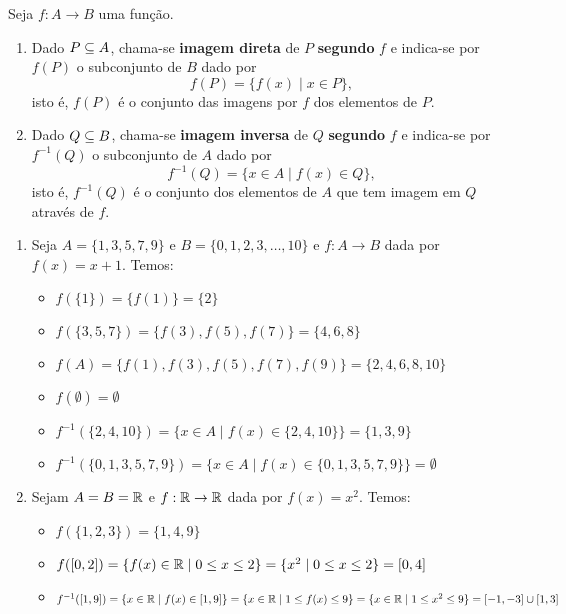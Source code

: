 \begin{definicao}
	Seja $f : A \to B$ uma fun{\c c}{\~a}o.
	\begin{enumerate}[label={\roman*})]
		\item Dado $P \subseteq A$, chama-se \textbf{imagem direta} de $P$  \textbf{segundo} $f$ e indica-se por $f(P)$ o subconjunto de $B$ dado por
		\[
			f(P) = \{f(x) \mid x \in P\},
		\]
		isto {\'e}, $f(P)$ {\'e} o conjunto das imagens por $f$ dos elementos de $P$.

		\item Dado $Q \subseteq B$, chama-se \textbf{imagem inversa} de $Q$ \textbf{segundo} $f$ e indica-se por $f^{-1}(Q)$ o subconjunto de $A$ dado por
		\[
			f^{-1}(Q) = \{x \in A \mid f(x) \in Q\},
		\]
		isto {\'e}, $f^{-1}(Q)$ {\'e} o conjunto dos elementos de $A$ que tem imagem em $Q$ atrav{\'e}s de $f$.
	\end{enumerate}
\end{definicao}

\begin{exemplos}
	\begin{enumerate}[label={\arabic*})]
		\item Seja $A = \{1, 3, 5, 7, 9 \}$ e $B = \{0, 1, 2, 3, \dots, 10\}$ e $f : A \to B$ dada por $f(x) = x + 1$. Temos:
		\begin{itemize}
			\item $f(\{1\}) = \{f(1)\} = \{2\}$

			\item $f(\{3, 5, 7\}) = \{f(3), f(5), f(7)\} = \{4, 6, 8\}$

			\item $f(A) = \{f(1), f(3), f(5), f(7), f(9)\} = \{2, 4, 6, 8, 10\}$

			\item $f(\emptyset) = \emptyset$

			\item $f^{-1}(\{2, 4, 10\}) = \{x \in A \mid f(x) \in \{2, 4, 10\}\} = \{1, 3, 9\}$

			\item $f^{-1}(\{0, 1, 3, 5, 7, 9\}) = \{x \in A \mid f(x) \in \{0, 1, 3, 5, 7, 9\}\} = \emptyset$
		\end{itemize}

		\item Sejam $A = B = \mathbb{R}$ e $f : \mathbb{R} \to \mathbb{R}$ dada por $f(x) = x^2$. Temos:
		\begin{itemize}
			\item $f(\{1, 2, 3\}) = \{1, 4, 9\}$

			\item $f([0,2]) = \{f(x) \in \mathbb{R} \mid 0 \le x \le 2 \} = \{x^2 \mid 0 \le x \le 2\} = [0, 4]$

			\item $f^{-1}([1, 9]) = \{x \in \mathbb{R} \mid f(x) \in [1, 9]\} = \{ x \in \mathbb{R} \mid 1 \le f(x) \le 9\} = \{x \in \mathbb{R} \mid 1 \le x^2 \le 9\} = [-1, -3] \cup [1, 3]$
		\end{itemize}
	\end{enumerate}
\end{exemplos}

